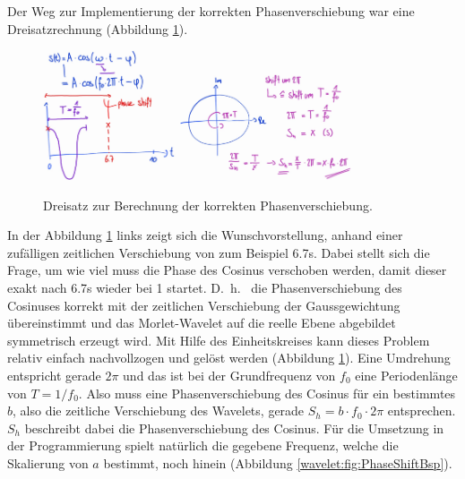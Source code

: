 Der Weg zur Implementierung der korrekten Phasenverschiebung war eine Dreisatzrechnung (Abbildung \ref{wavelet:fig:PhaseCalc}).
\begin{figure}
	\centering
	\includegraphics[width=0.35\textwidth]{papers/wavelets/images/10-1_PhaseCalc1.png}
	\includegraphics[width=0.45\textwidth]{papers/wavelets/images/10-2_PhaseCalc2.png}
	\caption{Dreisatz zur Berechnung der korrekten Phasenverschiebung.}
	\label{wavelet:fig:PhaseCalc}
\end{figure}
In der Abbildung \ref{wavelet:fig:PhaseCalc} links zeigt sich die Wunschvorstellung, anhand einer zufälligen zeitlichen Verschiebung von zum Beispiel 6.7s. Dabei stellt sich die Frage, um wie viel muss die Phase des Cosinus verschoben werden, damit dieser exakt nach 6.7s wieder bei 1 startet. D.~h.~ die Phasenverschiebung des Cosinuses korrekt mit der zeitlichen Verschiebung der Gaussgewichtung übereinstimmt und das Morlet-Wavelet auf die reelle Ebene abgebildet symmetrisch erzeugt wird.
Mit Hilfe des Einheitskreises kann dieses Problem relativ einfach nachvollzogen und gelöst werden (Abbildung \ref{wavelet:fig:PhaseCalc}). 
Eine Umdrehung entspricht gerade $2\pi$ und das ist bei der Grundfrequenz von $f_0$ eine Periodenlänge von $T=1/f_0$. Also muss eine Phasenverschiebung des Cosinus für ein bestimmtes $b$, also die zeitliche Verschiebung des Wavelets, gerade $S_h=b\cdot f_0\cdot 2\pi$ entsprechen. $S_h$ beschreibt dabei die Phasenverschiebung des Cosinus.
Für die Umsetzung in der Programmierung spielt natürlich die gegebene Frequenz, welche die Skalierung von $a$ bestimmt, noch hinein (Abbildung \ref{wavelet:fig:PhaseShiftBsp}).

